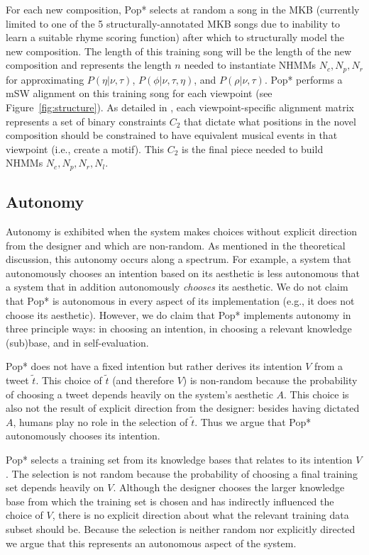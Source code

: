 \documentclass[phd,electronic,oneside,twosidetoc,letterpaper,chaptercenter,parttop,lol,lof,lot]{byumsphd}
\begin{document}
For each new composition, Pop* selects at random a song in the MKB (currently limited to one of the 5 structurally-annotated MKB songs due to inability to learn a suitable rhyme scoring function) after which to structurally model the new composition. The length of this training song will be the length of the new composition and represents the length $n$ needed to instantiate NHMMs $N_c, N_p, N_r$ for approximating $P(\eta|\nu,\tau)$, $P(\phi|\nu,\tau,\eta)$, and $P(\rho|\nu,\tau)$. Pop* performs a mSW alignment on this training song for each viewpoint (see Figure~\ref{fig:structure}). As detailed in \cite{bodily2018abstract}, each viewpoint-specific alignment matrix represents a set of binary constraints $C_2$ that dictate what positions in the novel composition should be constrained to have equivalent musical events in that viewpoint (i.e., create a motif). This $C_2$ is the final piece needed to build NHMMs $N_c, N_p, N_r, N_l$. 

\subsection{Autonomy}

Autonomy is exhibited when the system makes choices without explicit direction from the designer and which are non-random. As mentioned in the theoretical discussion, this autonomy occurs along a spectrum. For example, a system that autonomously chooses an intention based on its aesthetic is less autonomous that a system that in addition autonomously \textit{chooses} its aesthetic. We do not claim that Pop* is autonomous in every aspect of its implementation (e.g., it does not choose its aesthetic). However, we do claim that Pop* implements autonomy in three principle ways: in choosing an intention, in choosing a relevant knowledge (sub)base, and in self-evaluation.

Pop* does not have a fixed intention but rather derives its intention $V$ from a tweet $\tilde{t}$. This choice of $\tilde{t}$ (and therefore $V$) is non-random because the probability of choosing a tweet depends heavily on the system's aesthetic $A$. This choice is also not the result of explicit direction from the designer: besides having dictated $A$, humans play no role in the selection of $\tilde{t}$. Thus we argue that Pop* autonomously chooses its intention.

Pop* selects a training set from its knowledge bases that relates to its intention $V$. The selection is not random because the probability of choosing a final training set depends heavily on $V$. Although the designer chooses the larger knowledge base from which the training set is chosen and has indirectly influenced the choice of $V$, there is no explicit direction about what the relevant training data subset should be. Because the selection is neither random nor explicitly directed we argue that this represents an autonomous aspect of the system.
\end{document}
